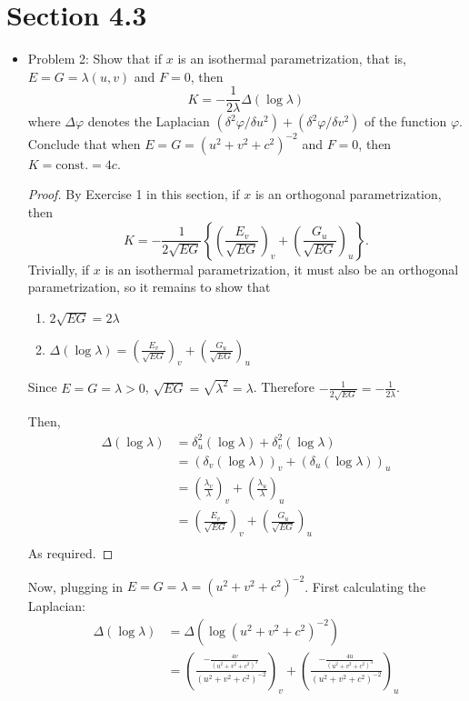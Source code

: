 \documentclass[a4paper,17pt]{extarticle}
\title{\scalebox{1.5}{Math 553 Homework 8}}
\author{\scalebox{1.5}{Theo Koss}}
\date{May 2022}
\theoremstyle{definition}
\renewcommand{\skip}{\par\null\par}
\begin{document}
\maketitle
\section{Section 4.3}
\begin{itemize}
    \item Problem 2: Show that if $x$ is an isothermal parametrization, that is, $E=G=\lambda(u,v)$ and $F=0$, then $$K=-\frac{1}{2\lambda}\Delta(\log{\lambda})$$ where $\Delta\varphi$ denotes the Laplacian $(\delta^2\varphi/\delta u^2)+(\delta^2\varphi/\delta v^2)$ of the function $\varphi$. Conclude that when $E=G=(u^2+v^2+c^2)^{-2}$ and $F=0$, then $K=\text{const.}=4c$.\begin{proof}By Exercise 1 in this section, if $x$ is an orthogonal parametrization, then $$K=-\frac{1}{2\sqrt{EG}}\left\{\left(\frac{E_v}{\sqrt{EG}}\right)_v+\left(\frac{G_u}{\sqrt{EG}}\right)_u\right\}.$$ Trivially, if $x$ is an isothermal parametrization, it must also be an orthogonal parametrization, so it remains to show that \begin{enumerate}
        \item $2\sqrt{EG}=2\lambda$
        \item $\Delta(\log\lambda)=\left(\frac{E_v}{\sqrt{EG}}\right)_v+\left(\frac{G_u}{\sqrt{EG}}\right)_u$
    \end{enumerate}Since $E=G=\lambda>0$, $\sqrt{EG}=\sqrt{\lambda^2}=\lambda$. Therefore $-\frac{1}{2\sqrt{EG}}=-\frac{1}{2\lambda}$.\skip Then,\begin{align*}
    \Delta(\log\lambda)&=\delta_u^2(\log\lambda)+\delta_v^2(\log\lambda)\\
    &=(\delta_v(\log\lambda))_v+(\delta_u(\log\lambda))_u\\
    &=\left(\frac{\lambda_v}{\lambda}\right)_v+\left(\frac{\lambda_u}{\lambda}\right)_u\\
    &=\left(\frac{E_v}{\sqrt{EG}}\right)_v+\left(\frac{G_u}{\sqrt{EG}}\right)_u\\
    \end{align*}
    As required.
    \end{proof}
    \skip Now, plugging in $E=G=\lambda=(u^2+v^2+c^2)^{-2}$. First calculating the Laplacian:\begin{align*}
        \Delta(\log\lambda)&=\Delta(\log(u^2+v^2+c^2)^{-2})\\
        &=\left(\frac{-\frac{4v}{\left(u^2+v^2+c^2\right)^3}}{(u^2+v^2+c^2)^{-2}}\right)_v+\left(\frac{-\frac{4u}{\left(u^2+v^2+c^2\right)^3}}{(u^2+v^2+c^2)^{-2}}\right)_u\\

\end{align*}
\end{itemize}
\end{document}
